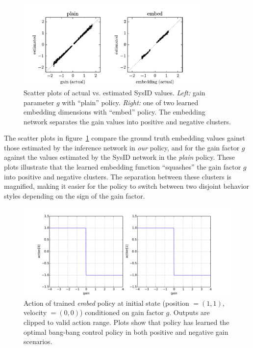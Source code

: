 \documentclass{article}
\newcommand{\TODO}[1]{}
\newcommand{\embed}{\emph{embed}}
\begin{document}
\begin{figure}
\centering
\includegraphics[width=0.85\textwidth]{pointmass_embed_scatter.pdf}
\caption{Scatter plots of actual vs. estimated SysID values.
\emph{Left:} gain parameter $g$ with ``plain'' policy.
\emph{Right:} one of two learned embedding dimensions with ``embed'' policy.
The embedding network separates the gain values into positive and negative clusters.
}
\label{fig:scatter}
\end{figure}
The scatter plots in figure~\ref{fig:scatter} compare the ground truth embedding values gainst those estimated by the inference network in \emph{our} policy, and for the gain factor $g$ against the values estimated by the SysID network in the \emph{plain} policy.
These plots illustrate that the learned embedding function ``squashes'' the gain factor $g$ into positive and negative clusters.
The separation between these clusters is magnified, making it easier for the policy to switch between two disjoint behavior styles depending on the sign of the gain factor.
\TODO{can we say anything less wishy-washy? how can we back up this claim?}

\begin{figure}
\centering
\includegraphics[width=\textwidth]{pointmass_conditional_action.pdf}
\caption{
Action of trained \embed{} policy at initial state (position $ = (1,1)$, velocity $=(0,0)$) conditioned on gain factor $g$.
Outputs are clipped to valid action range.
Plots show that policy has learned the optimal bang-bang control policy in both positive and negative gain scenarios.
}
\label{fig:conditional_action}
\end{figure}
\end{document}
